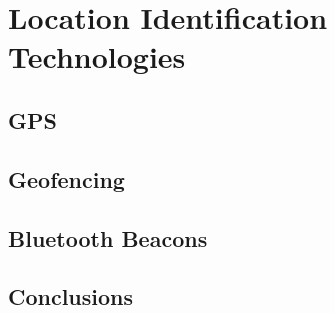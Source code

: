 \section{Location Identification Technologies}

\subsection{GPS}

\subsection{Geofencing}

\subsection{Bluetooth Beacons}


\subsection{Conclusions}